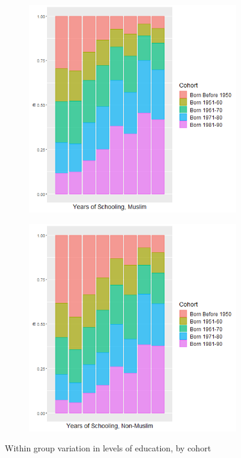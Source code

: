 \documentclass{article}
\begin{document}
\begin{figure}[H]
    \centering
    \begin{subfigure}{.49\textwidth}
        \centering
        \includegraphics[width = \textwidth]{images/graph_edu_mus.png}
    \end{subfigure}
    \begin{subfigure}{.49\textwidth}
       \centering
        \includegraphics[width = \textwidth]{images/graph_edu_nonmus.png}
        \end{subfigure}
   \caption{Within group variation in levels of education, by cohort}
   \label{fig:within_group}
    \end{figure}
\end{document}
